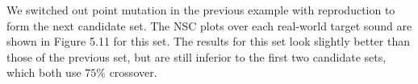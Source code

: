\documentclass[a4paper,12pt]{report} 	%
\numberwithin{figure}{chapter}
\numberwithin{table}{chapter}
\numberwithin{equation}{chapter}
\begin{document}
\begin{flushleft}
We switched out point mutation in the previous example with reproduction to form the next candidate set. The NSC plots over each real-world target sound are shown in Figure 5.11 for this set.
The results for this set look slightly better than those of the previous set, but are still inferior to the first two candidate sets, which both use $75\%$ crossover.


\end{flushleft}
\end{document}
